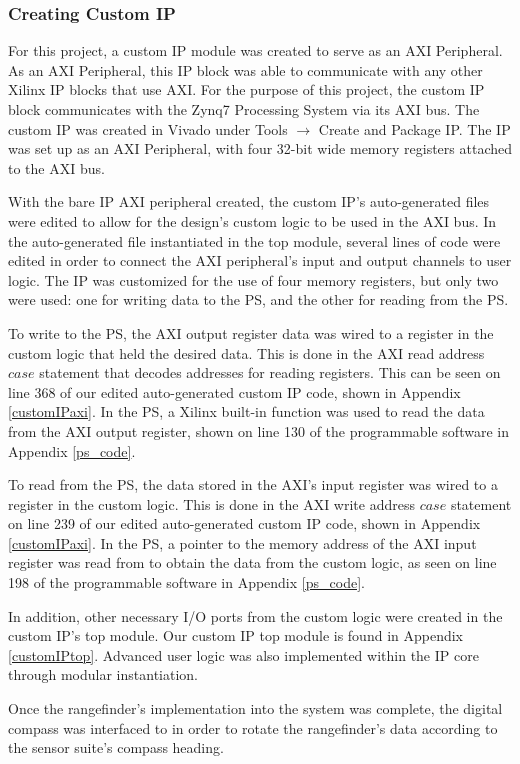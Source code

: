 \subsubsection{Creating Custom IP} \label{sssec:creatingCustomIP}
For this project, a custom IP module was created to serve as an AXI Peripheral. As an AXI Peripheral, this IP block was able to communicate with any other Xilinx IP blocks that use AXI. For the purpose of this project, the custom IP block communicates with the Zynq7 Processing System via its AXI bus. The custom IP was created in Vivado under Tools $\rightarrow$ Create and Package IP. The IP was set up as an AXI Peripheral, with four 32-bit wide memory registers attached to the AXI bus.
\par
With the bare IP AXI peripheral created, the custom IP's auto-generated files were edited to allow for the design's custom logic to be used in the AXI bus. In the auto-generated file instantiated in the top module, several lines of code were edited in order to connect the AXI peripheral's input and output channels to user logic. The IP was customized for the use of four memory registers, but only two were used: one for writing data to the PS, and the other for reading from the PS. 
\par
To write to the PS, the AXI output register data was wired to a register in the custom logic that held the desired data. This is done in the AXI read address $case$ statement that decodes addresses for reading registers. This can be seen on line 368 of our edited auto-generated custom IP code, shown in Appendix \ref{customIPaxi}. In the PS, a Xilinx built-in function was used to read the data from the AXI output register, shown on line 130 of the programmable software in Appendix \ref{ps_code}.
\par
To read from the PS, the data stored in the AXI's input register was wired to a register in the custom logic. This is done in the AXI write address $case$ statement on line 239 of our edited auto-generated custom IP code, shown in Appendix \ref{customIPaxi}. In the PS, a pointer to the memory address of the AXI input register was read from to obtain the data from the custom logic, as seen on line 198 of the programmable software in Appendix \ref{ps_code}.
\par
In addition, other necessary I/O ports from the custom logic were created in the custom IP's top module. Our custom IP top module is found in Appendix \ref{customIPtop}. Advanced user logic was also implemented within the IP core through modular instantiation.
\par
Once the rangefinder's implementation into the system was complete, the digital compass was interfaced to in order to rotate the rangefinder's data according to the sensor suite's compass heading.
